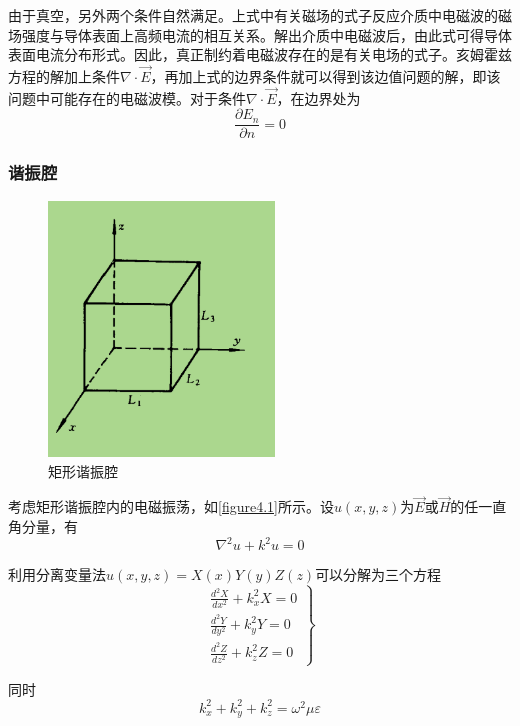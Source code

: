 \documentclass[UTF8]{ctexart}
\begin{document}
\noindent 由于真空，另外两个条件自然满足。上式中有关磁场的式子反应介质中电磁波的磁场强度与导体表面上高频电流的相互关系。解出介质中电磁波后，由此式可得导体表面电流分布形式。因此，真正制约着电磁波存在的是有关电场的式子。亥姆霍兹方程的解加上条件$\nabla \cdot \vec{E}$，再加上式的边界条件就可以得到该边值问题的解，即该问题中可能存在的电磁波模。对于条件$\nabla \cdot \vec{E}$，在边界处为
\begin{equation}
    \frac{\partial E_n}{\partial n} = 0
\end{equation}

    \newpage
    \subsubsection{谐振腔}
    \begin{figure}
        \centering
        \includegraphics[width=6cm]{figure4-1.png}
        \caption{矩形谐振腔}
        \label{figure4.1}
    \end{figure}

    考虑矩形谐振腔内的电磁振荡，如\autoref{figure4.1}所示。设$u(x,y,z)$为$\vec{E}$或$\vec{H}$的任一直角分量，有
    \begin{equation}
        \nabla^2 u + k^2 u = 0
    \end{equation}

\noindent 利用分离变量法$u(x,y,z)=X(x)Y(y)Z(z)$可以分解为三个方程
\begin{equation}
\left.\begin{array}{l}{\frac{d^{2} X}{d x^{2}}+k_{x}^{2} X=0} \\ {\frac{d^{2} Y}{d y^{2}}+k_{y}^{2} Y=0} \\ {\frac{d^{2} Z}{d z^{2}}+k_{z}^{2} Z=0}\end{array}\right\}
\end{equation}

\noindent 同时
\begin{equation}
    k_x^2 + k_y^2 +k_z^2 = \omega^2 \mu \varepsilon
\end{equation}
\end{document}
